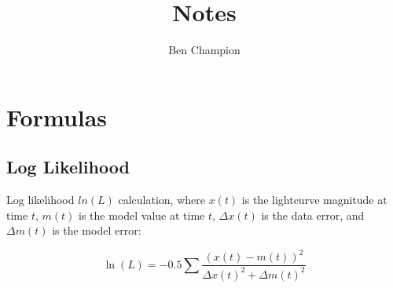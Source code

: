 \documentclass{article}
\author{Ben Champion}
\title{Notes}
\begin{document}
\maketitle

\section{Formulas}

\subsection{Log Likelihood}

Log likelihood $ln(L)$ calculation, where $x(t)$ is the lightcurve magnitude at time $t$,
$m(t)$ is the model value at time $t$, $\Delta x(t)$ is the data error, and $\Delta m(t)$
is the model error:

\begin{equation}
        \ln(L) = -0.5 \sum \frac {(x(t) - m(t))^2} {\Delta x(t)^2 + \Delta m(t)^2}
\end{equation}
\end{document}

